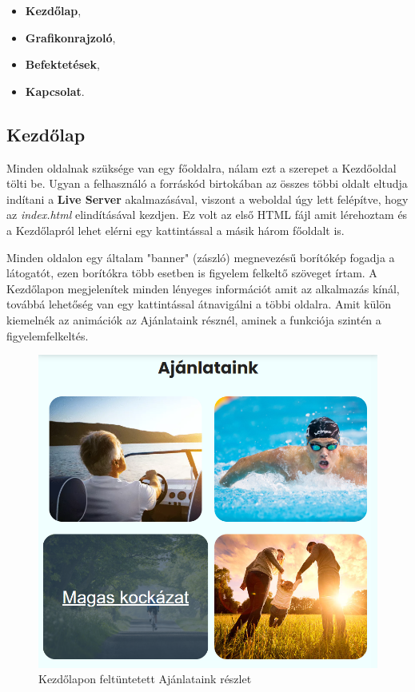 \begin{itemize}
\item \textbf{Kezdőlap},
\item \textbf{Grafikonrajzoló},
\item \textbf{Befektetések},
\item \textbf{Kapcsolat}.
\end{itemize}

\subsection{Kezdőlap}

Minden oldalnak szüksége van egy főoldalra, nálam ezt a szerepet a Kezdőoldal tölti be. Ugyan a felhasználó a forráskód birtokában az összes többi oldalt eltudja indítani a \textbf{Live Server} akalmazásával, viszont a weboldal úgy lett felépítve, hogy az \emph{index.html} elindításával kezdjen. Ez volt az első HTML fájl amit lérehoztam és a Kezdőlapról lehet elérni egy kattintással a másik három főoldalt is.

	Minden oldalon egy általam "banner" (zászló) megnevezésű borítókép fogadja a látogatót, ezen borítókra több esetben is figyelem felkeltő szöveget írtam. A Kezdőlapon megjelenítek minden lényeges információt amit az alkalmazás kínál, továbbá lehetőség van egy kattintással átnavigálni a többi oldalra. Amit külön kiemelnék az animációk az Ajánlataink résznél, aminek a funkciója szintén a figyelemfelkeltés.

\begin{figure}[h]
\centering
\includegraphics[scale=0.4]{images/home.png}
\caption{Kezdőlapon feltüntetett Ajánlataink részlet}
\end{figure}

